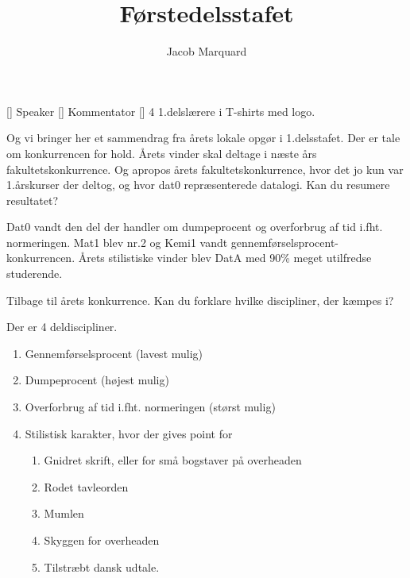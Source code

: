 \documentclass[a4paper,11pt]{article}
\title{Førstedelsstafet}
\author{Jacob Marquard}
\begin{document}
\maketitle

\begin{roles}
    [] Speaker
    [] Kommentator
    [] 4 1.delslærere i T-shirts med logo.
\end{roles}

\begin{sketch}

     Og vi bringer her et sammendrag fra årets lokale opgør i 1.delsstafet.
             Der er tale om konkurrencen for hold. Årets vinder skal deltage i næste års fakultetskonkurrence.
             Og apropos årets fakultetskonkurrence, hvor det jo kun var 1.årskurser der deltog, og hvor dat0 repræsenterede datalogi.
             Kan du resumere resultatet?

     Dat0 vandt den del der handler om dumpeprocent og overforbrug af tid i.fht. normeringen. Mat1 blev nr.2 og Kemi1 vandt
             gennemførselsprocent-konkurrencen. Årets stilistiske vinder blev DatA med 90\% meget utilfredse studerende.
    
     Tilbage til årets konkurrence. Kan du forklare hvilke discipliner, der kæmpes i?

     Der er 4 deldiscipliner.
             \begin{enumerate}
                \item Gennemførselsprocent (lavest mulig)
                \item Dumpeprocent (højest mulig)
                \item Overforbrug af tid i.fht. normeringen (størst mulig)
                \item Stilistisk karakter, hvor der gives point for
                    \begin{enumerate}
                        \item Gnidret skrift, eller for små bogstaver på overheaden
                        \item Rodet tavleorden
                        \item Mumlen
                        \item Skyggen for overheaden
                        \item Tilstræbt dansk udtale.
                    \end{enumerate}
             \end{enumerate}


\end{sketch}
\end{document}
